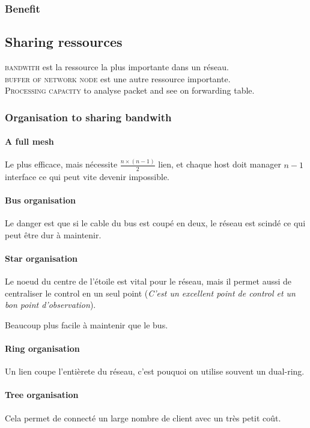 \subsubsection{Benefit}

\subsection{Sharing ressources}

\textsc{bandwith} est la ressource la plus importante dans un réseau.\\
\textsc{buffer of network node} est une autre ressource importante.\\
\textsc{Processing capacity} to analyse packet and see on forwarding table.

\subsubsection{Organisation to sharing bandwith}

\paragraph{A full mesh}
Le plus efficace, mais nécessite $\frac{n \times (n-1)}{2}$ lien, et chaque
host doit manager $n-1$ interface ce qui peut vite devenir impossible.

\paragraph{Bus organisation}
Le danger est que si le cable du bus est coupé en deux, le réseau est scindé
ce qui peut être dur à maintenir.

\paragraph{Star organisation}
Le noeud du centre de l'étoile est vital pour le réseau, mais il permet aussi
de centraliser le control en un seul point (\textit{C'est un excellent point de
control et un bon point d'observation}).

Beaucoup plus facile à maintenir que le bus.


\paragraph{Ring organisation}
Un lien coupe l'entièrete du réseau, c'est pouquoi on utilise souvent un dual-ring.

\paragraph{Tree organisation}
Cela permet de connecté un large nombre de client avec un très petit coût.



